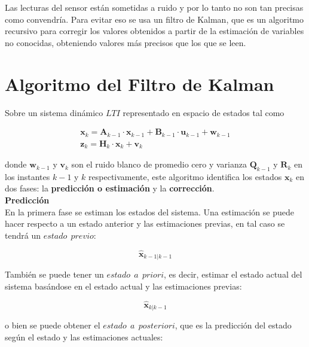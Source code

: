 \documentclass[twoside,11pt]{book}
\begin{document}
Las lecturas del sensor están sometidas a ruido y por lo tanto no son tan precisas como convendría. Para evitar eso se usa un filtro de Kalman,  que es un algoritmo recursivo para corregir los valores obtenidos a partir de la estimación de variables no conocidas, obteniendo valores más precisos que los que se leen. 

\section*{Algoritmo del Filtro de Kalman}

Sobre un sistema dinámico $LTI$ representado en espacio de estados tal como

\begin{equation}
\begin{array}{l}
\mathbf{x}_{k}=\mathbf{A}_{k-1} \cdot \mathbf{x}_{k-1} + \mathbf{B}_{k-1} \cdot \mathbf{u}_{k-1} + \mathbf{w}_{k-1} \\
\mathbf{z}_{k}=\mathbf{H}_{k} \cdot \mathbf{x}_{k} + \mathbf{v}_{k}
\end{array}
\end{equation}		

donde $\mathbf{w}_{k-1}$ y $\mathbf{v}_{k}$ son el ruido blanco de promedio cero y varianza $\mathbf{Q}_{k-1}$ y $\mathbf{R}_{k}$ en los instantes $k-1$ y $k$ respectivamente, este algoritmo identifica los estados $\mathbf{x}_{k}$ en dos fases: la \textbf{predicción o estimación} y la \textbf{corrección}.  \\

\textbf{Predicción}\\

En la primera fase se estiman los estados del sistema. Una estimación se puede hacer respecto a un estado anterior y las estimaciones previas, en tal caso se tendrá un $estado \>\> previo$:

\begin{equation}
\hat{\mathbf{x}}_{k-1|k-1}
\end{equation}

También se puede tener un $estado \>\> a \>\> priori$, es decir, estimar el estado actual del sistema basándose en el estado actual y las estimaciones previas:

\begin{equation}
\hat{\mathbf{x}}_{k|k-1}
\end{equation}

o bien se puede obtener el $estado \>\> a \>\> posteriori$, que es la predicción del estado según el estado y las estimaciones actuales:
\end{document}
